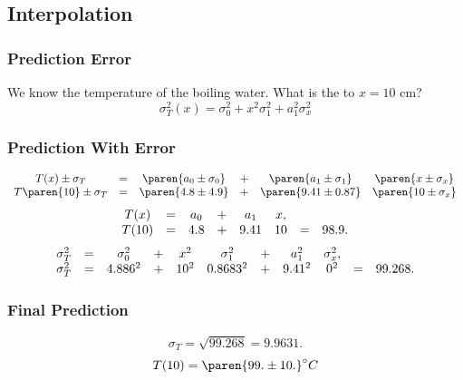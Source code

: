 \subsection{Interpolation}
%
%
\begin{frame}\frametitle{Prediction Error}
We know the temperature of the boiling water. What is the  to $x=10$ cm?
\begin{equation}
	\sigma_{T}^{2}(x) = \sigma_{0}^{2} + x^{2} \sigma_{1}^{2} + a_{1}^{2} \sigma_{x}^{2} 
\end{equation}
\end{frame}
%
%
\begin{frame}\frametitle{Prediction With Error}
\begin{equation}
\begin{array}{ccccc c}
	T(x) \pm \sigma_{T}&=& \paren{ a_{0} \pm \sigma_{0} } &+&  \paren{ a_{1} \pm \sigma_{1} } & \paren{ x \pm \sigma_{x} } \\
	T\paren{10} \pm \sigma_{T} &=& \paren{ 4.8 \pm 4.9 } &+&  \paren{ 9.41 \pm 0.87 } & \paren{ 10 \pm \sigma_{x} }
\end{array}
\label{eq:bevington interpolation template}
\end{equation}
%
\pause
%
\begin{equation}
\begin{array}{ccccc ccc}
	T(x) &=& a_{0} &+&  a_{1} & x,\\
	T(10) &=&4.8 &+& 9.41 & 10 & = & 98.9.\\
\end{array}
\label{eq:bevington interpolation value}
\end{equation}
%
\pause
%
\begin{equation}
\begin{array}{ccccc ccccc c}
	\sigma_{T}^{2} &=& \sigma_{0}^{2} &+& x^{2} & \sigma_{1}^{2} &+& a_{1}^{2} & \sigma_{x}^{2}, \\
	\sigma_{T}^{2} &=& 4.886^{2} &+& 10^{2} & 0.8683^{2} &+& 9.41^{2} & 0^{2} &=& 99.268. \\
\end{array}
\label{eq:bevington interpolation error numeric}
\end{equation}
\end{frame}
%
%
\begin{frame}\frametitle{Final Prediction}
\begin{equation}
		\sigma_{T} = \sqrt{ 99.268 } = 9.9631.
\end{equation}
\begin{equation}
	T(10) = \paren{ 99. \pm 10. }^{\circ}C
\label{eq:bev 1 t(10)}
\end{equation}
\end{frame}
%

